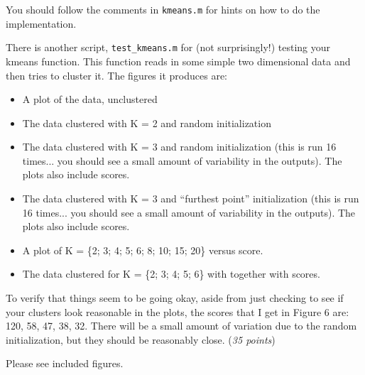 \documentclass[fleqn]{article}
\begin{document}
You should follow the comments in \texttt{kmeans.m} for hints on how to do the 
implementation. 

There is another script, \texttt{test\_kmeans.m} for (not surprisingly!) testing 
your kmeans function. This function reads in some simple two dimensional data and 
then tries to cluster it. The figures it produces are:

\begin{itemize}
  \item A plot of the data, unclustered
  \item The data clustered with K = 2 and random initialization
  \item The data clustered with K = 3 and random initialization (this is run 
  16 times... you should see a small
  amount of variability in the outputs). The plots also include scores.
  \item The data clustered with K = 3 and ``furthest point'' initialization 
  (this is run 16 times... you should see a small amount of variability in the 
  outputs). The plots also include scores.
  \item A plot of K = \{2; 3; 4; 5; 6; 8; 10; 15; 20\} versus score.
  \item The data clustered for K = \{2; 3; 4; 5; 6\} with together with scores.
\end{itemize}

To verify that things seem to be going okay, aside from just checking to see if 
your clusters look reasonable in the plots, the scores that I get in Figure 6 are: 
120, 58, 47, 38, 32. There will be a small amount of variation due to the random 
initialization, but they should be reasonably close. (\textit{35 points})

\ene

\begin{solution}
Please see included figures.
\end{solution}
\end{document}
